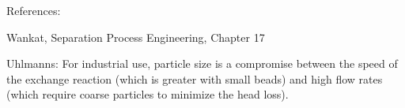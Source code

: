 References:

Wankat, Separation Process Engineering, Chapter 17

Uhlmanns: For industrial use, particle size is a compromise between the speed of the exchange reaction (which is greater with small beads) and high flow rates (which require coarse particles to minimize the head loss).
